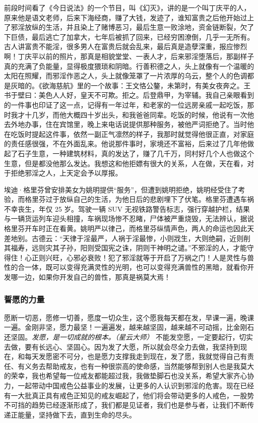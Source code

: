 前段时间看了《今日说法》的一个节目，叫《幻灭》，讲的是一个叫丁庆平的人，原来他是语文老师，后来下海经商，赚了大钱，发迹了，谁知富贵之后他开始过上了邪淫放纵的生活，并且染上了赌博恶习，最后生意一败涂地，资金链断裂，欠了下巨债，最后逃亡了加拿大，七年后被抓了回来，已经穷困潦倒，几乎一无所有。古人讲富贵不能淫，很多男人在富贵后就会乱来，最后真是造孽深重，报应惨烈啊！丁庆平以前的照片，那真是相貌堂堂、一表人才，后来邪淫堕落后，那副样子真的充满了负能量，显得极度猥琐和阴暗。行善积德之人，头上就像有一个温暖的太阳在照耀，而邪淫作恶之人，头上就像笼罩了一片浓厚的乌云，整个人的色调都是灰暗的。《欲海慈航》里的一个故事：王文恪公鏊，未第时，有美女夜奔之。王书于壁曰：美色人人好，皇天不可欺。拒之。后登鼎甲，为宰辅。我自己亲眼看到的一件事也印证了这一点，记得有一年过年，和老家的一位远房亲戚一起吃饭，那时我才十几岁，而他大概四十岁出头，和我爸爸同辈。吃饭的时候，他说有一次他去外地办事，住在宾馆里，晚上来电话说提供那种服务，被他严词拒绝了。当时他在吃饭时提起这件事，依然一副正气凛然的样子，我那时就觉得他很正直，对家庭的责任感很强，不在外面乱来。他说那件事时，家境还不富裕，后来过了几年他做起了石子生意，一种建筑材料，真的发达了，赚了几千万，同村好几个人也做这个生意，但是都没他那么发达。我想这和他拒嫖有很大的关系，人在做，天在看，对于拒绝邪淫之人，上天定会予以厚报。

埃迪·格里芬曾安排美女为姚明提供“服务”，但遭到姚明拒绝，姚明经受住了考验，而格里芬过于放纵自己的生活，为他日后的悲剧埋下了伏笔。格里芬遭遇车祸不幸丧生，年仅 25 岁。驾驶一辆 SUV 无视铁路警告标志，强行穿越护栏，结果与一辆货运列车迎头相撞，车祸现场惨不忍睹，尸体被严重烧毁，无法辨认，据说格里芬开车时正在看黄。姚明严以律己，而格里芬纵情声色，两人的命运也因此天差地别。古德云：“天律于淫最严，人祸于淫最惨，小则戕生，大则绝嗣，近则削其福寿，远则灾其子孙，阳则受国宪之诛，阴则干神明之谴。”不邪淫的人，才能守得住！心正则兴旺，心邪必衰败！犯了邪淫就等于开启了万祸之门！人是灵性与兽性的合一体，既可以变得充满灵性的光明，也可以变得充满兽性的黑暗，就看你开发哪一边，如果你开发自己的兽性，那真是祸莫大焉！

\subsubsection{誓愿的力量}

愿断一切恶，愿修一切善，愿度一切众生，这个愿我每天都在发，早课一遍，晚课一遍。金刚非坚，愿力最坚！一遍遍发，越来越坚固，越来越不可动摇，比金刚石还坚固。\textit{发愿，是一切成就的根本。（星云大师）} 不能发空愿，一定要起行，切实去做，要有长远心、坚固心。因为发了大愿，所以就会尽全力去做，我坚持到现在，和每天发愿密不可分，也是愿力支撑我走到现在，发了愿，我就觉得自己有责任、有义务去帮助戒友，也有一种很崇高的使命感，当然能够帮到别人也是我莫大的荣幸，我也希望每一位戒友都能超过我，我做垫脚石也没关系，希望大家齐心协力，一起带动中国戒色公益事业的发展，让更多的人认识到邪淫的危害。现在已经有一大批真正具有戒色正知见的戒友崛起了，他们将会带动更多的人戒色，一股势不可挡的趋势已经逐渐形成了，我们都是见证者，我们也是参与者，让我们不断传递正能量，坚持做下去，直到生命的尽头。

